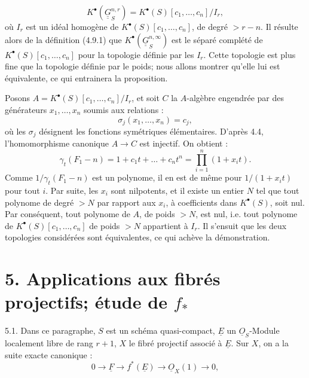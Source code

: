
\[
  K^{\bullet}(\underline{\underline{G}}_S^{n,r})=K^{\bullet}(S)[c_1,\ldots,c_n]/I_r,
\]
où \(I_r\) est un idéal homogène de \(K^{\bullet}(S)[c_1,\ldots,c_n]\), de
degré \(>r-n\). Il résulte alors de la définition (4.9.1) que \(K^{\bullet}(\underline{\underline{G}}_S^{n,\infty})\) est le séparé complété de \(K^{\bullet}(S)[c_1,\ldots,c_n]\) pour la topologie définie par les \(I_r\). Cette topologie est plus fine que la topologie définie par le poids; nous allons montrer qu'elle lui est équivalente, ce qui entrainera la proposition.

Posons \(A=K^{\bullet}(S)[c_1,\ldots,c_n]/I_r\), et soit \(C\) la \(A\)-algèbre engendrée par des générateurs \(x_1,\ldots,x_n\) soumis aux relations :
\[
  \sigma_j(x_1,\ldots,x_n)=c_j,
\]
où les \(\sigma_j\) désignent les fonctions symétriques élémentaires. D'après 4.4, l'homomorphisme canonique \(A\to C\) est injectif. On obtient :
\[
  \gamma_t(F_1-n)
  =1+c_1t+\ldots+c_nt^n
  =\prod_{i=1}^n(1+x_it).
\]
Comme \(1/\gamma_t(F_1-n)\) est un polynome, il en est de même pour \(1/(1+x_it)\) pour tout \(i\). Par suite, les \(x_i\) sont nilpotents, et il existe un entier \(N\) tel que tout polynome de degré \(>N\) par rapport aux \(x_i\), à coefficients dans \(K^{\bullet}(S)\), soit nul. Par conséquent, tout polynome de \(A\), de poids \(>N\), est nul, i.e. tout polynome de \(K^{\bullet}(S)[c_1,\ldots,c_n]\) de poids \(>N\) appartient à \(I_r\). Il s'ensuit que les deux topologies considérées sont équivalentes, ce qui achève la démonstration.


\section*{5. Applications aux fibrés projectifs; étude de \texorpdfstring{$f_*$}{f*}}

5.1.
Dans ce paragraphe, $S$ est un schéma quasi-compact, $\underline{E}$ un $\underline{O}_S$-Module localement libre de rang $r+1$, $X$ le fibré projectif associé à $\underline{E}$. Sur $X$, on a la suite exacte canonique :
\[
  0\longrightarrow \underline{F}\longrightarrow f^*(\underline{E})\longrightarrow \underline{O}_X(1)\longrightarrow 0,
\]
